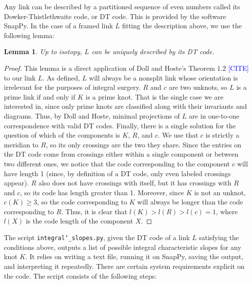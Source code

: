 \documentclass[11pt,usenames,dvipsnames,reqno]{amsart}
\numberwithin{theorem}{section}
\newtheorem{lemma}[theorem]{Lemma}
\theoremstyle{ex}
\theoremstyle{rem}
\def\kh#1{\textcolor{Blue}{#1}}
\begin{document}
Any link can be described by a partitioned sequence of even numbers called its Dowker-Thistlethwaite  code, or DT code. This is provided by the software SnapPy. In the case of a framed link $L$ fitting the description above, we use the following lemma:

\begin{lemma}
	Up to isotopy, $L$ can be uniquely described by its DT code.
\end{lemma}
\begin{proof}
	This lemma is a direct application of Doll and Hoste's Theorem 1.2 \kh{[CITE]} to our link $L$. As defined, $L$ will always be a nonsplit link whose orientation is irrelevant for the purposes of integral surgery. $R$ and $c$ are two unknots, so $L$ is a prime link if and only if $K$ is a prime knot. That is the single case we are interested in, since only prime knots are classified along with their invariants and diagrams. Thus, by Doll and Hoste, minimal projections of $L$ are in one-to-one correspondence with valid DT codes.
	Finally, there is a single solution for the question of which of the components is $K$, $R$, and $c$. We use that $c$ is strictly a meridian to $R$, so its only crossings are the two they share. Since the entries on the DT code come from crossings either within a single component or between two different ones, we notice that the code corresponding to the component $c$ will have length 1 (since, by definition of a DT code, only even labeled crossings appear). $R$ also does not have crossings with itself, but it has crossings with $R$ and $c$, so its code has length greater than 1. Moreover, since $K$ is not an unknot, $c(K) \geq 3$, so the code corresponding to $K$ will always be longer than the code corresponding to $R$. Thus, it is clear that $l(K) > l(R) > l(c) = 1$, where $l(X)$ is the code length of the component $X$.
\end{proof}

The script \texttt{integral\char`_slopes.py}, given the DT code of a link $L$ satisfying the conditions above, outputs a list of possible integral characteristic slopes for any knot $K$. It relies on writing a text file, running it on SnapPy, saving the output, and interpreting it repeatedly. There are certain system requirements explicit on the code. The script consists of the following steps:
\end{document}
